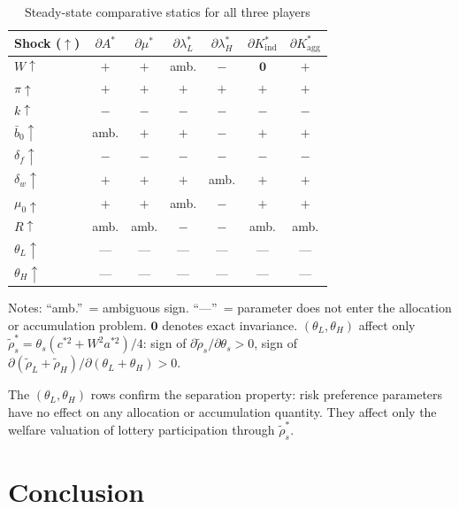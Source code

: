 \documentclass[12pt,a4paper]{article}
\begin{document}
\begin{table}[h!]
\centering
\caption{Steady-state comparative statics for all three players}
\label{tab:cs}
\renewcommand{\arraystretch}{1.2}
\begin{tabular}{lcccccc}
\toprule
Shock ($\uparrow$)
  & $\partial A^*$
  & $\partial\mu^*$
  & $\partial\lambda_L^*$
  & $\partial\lambda_H^*$
  & $\partial K^*_{\mathrm{ind}}$
  & $\partial K^*_{\mathrm{agg}}$ \\
\midrule
$W\uparrow$           & $+$ & $+$ & amb. & $-$   & $\mathbf{0}$ & $+$ \\
$\pi\uparrow$         & $+$ & $+$ & $+$  & $+$   & $+$          & $+$ \\
$k\uparrow$           & $-$ & $-$ & $-$  & $-$   & $-$          & $-$ \\
$\bar{b}_0\uparrow$   & amb.& $+$ & $+$  & $-$   & $+$          & $+$ \\
$\delta_f\uparrow$    & $-$ & $-$ & $-$  & $-$   & $-$          & $-$ \\
$\delta_w\uparrow$    & $+$ & $+$ & $+$  & amb.  & $+$          & $+$ \\
$\mu_0\uparrow$       & $+$ & $+$ & amb. & $-$   & $+$          & $+$ \\
$R\uparrow$           & amb.& amb.& $-$  & $-$   & amb.         & amb.\\
\midrule
$\theta_L\uparrow$    & --- & --- & ---  & ---   & ---          & --- \\
$\theta_H\uparrow$    & --- & --- & ---  & ---   & ---          & --- \\
\bottomrule
\end{tabular}

\medskip
\small Notes: ``amb.''\ = ambiguous sign. ``---''\ = parameter does not
enter the allocation or accumulation problem. $\mathbf{0}$ denotes
exact invariance. $(\theta_L,\theta_H)$ affect only
$\tilde\rho_s^* = \theta_s(c^{*2}+W^2a^{*2})/4$: sign of $\partial\tilde\rho_s/\partial\theta_s > 0$,
sign of $\partial(\tilde\rho_L+\tilde\rho_H)/\partial(\theta_L+\theta_H) > 0$.
\end{table}

The $(\theta_L, \theta_H)$ rows confirm the separation property: risk
preference parameters have no effect on any allocation or accumulation
quantity. They affect only the welfare valuation of lottery
participation through $\tilde\rho_s^*$.

\section{Conclusion}
\end{document}
